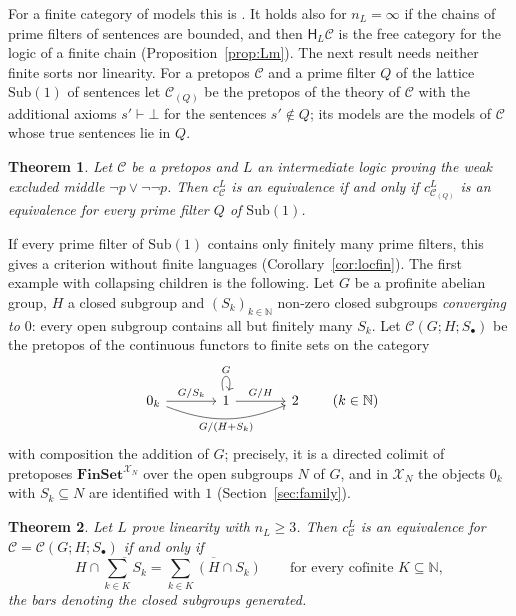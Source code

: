 \documentclass[11pt]{amsart}
\newtheorem{thm}{Theorem}[section]
\theoremstyle{definition}
\newcommand{\Fin}{\mathbf{FinSet}}
\newcommand{\Sub}{\mathrm{Sub}}
\newcommand{\HH}{\mathsf H}
\newcommand{\cX}{\mathcal X}
\newcommand{\cC}{\mathcal C}
\begin{document}
For a finite category of models this is \cite[Prop.~4.2]{Strings}.
It holds also for $n_L=\infty$ if the chains of prime filters of
sentences are bounded, and then $\HH_L\cC$ is the free category for
the logic of a finite chain (Proposition~\ref{prop:Lm}). The next result
needs neither finite sorts nor linearity. For a pretopos
$\cC$ and a prime filter $Q$ of the lattice $\Sub(1)$ of sentences let
$\cC_{(Q)}$ be the pretopos of the theory of $\cC$ with the additional
axioms $s'\vdash\bot$ for the sentences $s'\notin Q$; its models are
the models of $\cC$ whose true sentences lie in $Q$.

\begin{thm}\label{thm:C}
Let $\cC$ be a pretopos and $L$ an intermediate logic proving the weak
excluded middle $\neg p\vee\neg\neg p$. Then $c^L_\cC$ is an
equivalence if and only if $c^L_{\cC_{(Q)}}$ is an equivalence for
every prime filter $Q$ of $\Sub(1)$.
\end{thm}

If every prime filter of $\Sub(1)$ contains only finitely many prime
filters, this gives a criterion without finite languages
(Corollary~\ref{cor:locfin}). The first example with collapsing children is the following. Let $G$
be a profinite abelian group, $H$ a closed subgroup and
$(S_k)_{k\in\mathbb N}$ non-zero closed subgroups \emph{converging to
$0$}: every open subgroup contains all but finitely many $S_k$. Let
$\cC(G;H;S_\bullet)$ be the pretopos of the continuous functors to
finite sets on the category
\[
\begin{tikzcd}[column sep=large]
0_k\ar[r,"G/S_k"]\ar[rr,bend right=22,"G/(H+S_k)"']&1\ar[r,"G/H"]
\ar[loop above,"G"]&2
\end{tikzcd}\qquad(k\in\mathbb N)
\]
with composition the addition of $G$; precisely, it is a directed
colimit of pretoposes $\Fin^{\cX_N}$ over the open subgroups $N$ of
$G$, and in $\cX_N$ the objects $0_k$ with $S_k\subseteq N$ are
identified with $1$ (Section~\ref{sec:family}).

\begin{thm}\label{thm:D}
Let $L$ prove linearity with $n_L\ge3$. Then $c^L_\cC$ is an
equivalence for $\cC=\cC(G;H;S_\bullet)$ if and only if
\begin{equation}\label{eq:cofintro}
H\cap\overline{\sum_{k\in K}S_k}=\overline{\sum_{k\in K}(H\cap S_k)}
\qquad\text{for every cofinite }K\subseteq\mathbb N,
\end{equation}
the bars denoting the closed subgroups generated.
\end{thm}
\end{document}
